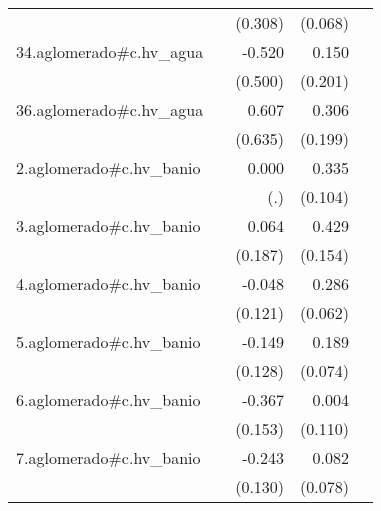 {\begin{longtable}{l*{4}{D{.}{.}{-1}}}
            &                     &     (0.308)         &     (0.068)         &                     \\
\addlinespace
34.aglomerado#c.hv\_agua&                     &      -0.520         &       0.150         &                     \\
            &                     &     (0.500)         &     (0.201)         &                     \\
\addlinespace
36.aglomerado#c.hv\_agua&                     &       0.607         &       0.306         &                     \\
            &                     &     (0.635)         &     (0.199)         &                     \\
\addlinespace
2.aglomerado#c.hv\_banio&                     &       0.000         &       0.335\sym{**} &                     \\
            &                     &         (.)         &     (0.104)         &                     \\
\addlinespace
3.aglomerado#c.hv\_banio&                     &       0.064         &       0.429\sym{**} &                     \\
            &                     &     (0.187)         &     (0.154)         &                     \\
\addlinespace
4.aglomerado#c.hv\_banio&                     &      -0.048         &       0.286\sym{***}&                     \\
            &                     &     (0.121)         &     (0.062)         &                     \\
\addlinespace
5.aglomerado#c.hv\_banio&                     &      -0.149         &       0.189\sym{*}  &                     \\
            &                     &     (0.128)         &     (0.074)         &                     \\
\addlinespace
6.aglomerado#c.hv\_banio&                     &      -0.367\sym{*}  &       0.004         &                     \\
            &                     &     (0.153)         &     (0.110)         &                     \\
\addlinespace
7.aglomerado#c.hv\_banio&                     &      -0.243         &       0.082         &                     \\
            &                     &     (0.130)         &     (0.078)         &                     \\

\end{longtable}}
